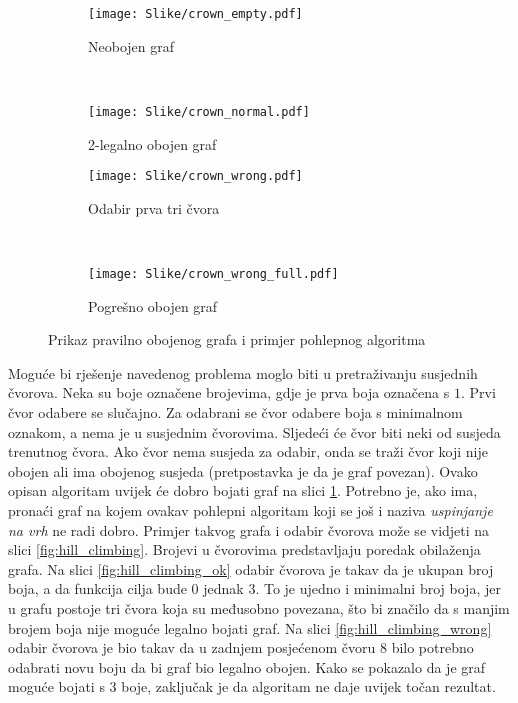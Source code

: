 \documentclass[times, utf8, diplomski, numeric]{fer}
\begin{document}
\begin{figure}
        \centering
        \begin{subfigure}[b]{0.33\textwidth}
                \texttt{[image: Slike/crown\_empty.pdf]}
                \caption{Neobojen graf}
                \label{fig:crown_empty}
        \end{subfigure}
        ~
        \begin{subfigure}[b]{0.33\textwidth}
                \texttt{[image: Slike/crown\_normal.pdf]}
                \caption{2-legalno obojen graf}
                \label{fig:crown_normal}
        \end{subfigure}
         
        \begin{subfigure}[b]{0.33\textwidth}
                \texttt{[image: Slike/crown\_wrong.pdf]}
                \caption{Odabir prva tri čvora}
                \label{fig:crown_wrong}
        \end{subfigure}
        ~
        \begin{subfigure}[b]{0.33\textwidth}
                \texttt{[image: Slike/crown\_wrong\_full.pdf]}
                \caption{Pogrešno obojen graf}
                \label{fig:crown_wrong_full}
        \end{subfigure}
        \caption{Prikaz pravilno obojenog grafa i primjer pohlepnog algoritma}
        \label{fig:greedy_alg}
\end{figure}


Moguće bi rješenje navedenog problema moglo biti u pretraživanju susjednih čvorova. Neka su boje označene brojevima, gdje je prva boja označena s $1$. Prvi čvor odabere se slučajno. Za odabrani se čvor odabere boja s minimalnom oznakom, a nema je u susjednim čvorovima. Sljedeći će čvor biti neki od susjeda trenutnog čvora. Ako čvor nema susjeda za odabir, onda se traži čvor koji nije obojen ali ima obojenog susjeda (pretpostavka je da je graf povezan). Ovako opisan algoritam uvijek će dobro bojati graf na slici \ref{fig:crown_empty}. Potrebno je, ako ima, pronaći graf na kojem ovakav pohlepni algoritam koji se još i naziva \emph{uspinjanje na vrh} ne radi dobro. Primjer takvog grafa i odabir čvorova može se vidjeti na slici \ref{fig:hill_climbing}. Brojevi u čvorovima predstavljaju poredak obilaženja grafa. Na slici \ref{fig:hill_climbing_ok} odabir čvorova je takav da je ukupan broj boja, a da funkcija cilja bude $0$ jednak $3$. To je ujedno i minimalni broj boja, jer u grafu postoje tri čvora koja su međusobno povezana, što bi značilo da s manjim brojem boja nije moguće legalno bojati graf. Na slici \ref{fig:hill_climbing_wrong} odabir čvorova je bio takav da u zadnjem posjećenom čvoru $8$ bilo potrebno odabrati novu boju da bi graf bio legalno obojen. Kako se pokazalo da je graf moguće bojati s $3$ boje, zaključak je da algoritam ne daje uvijek točan rezultat.
\end{document}

